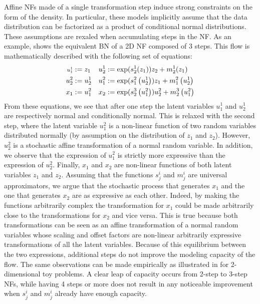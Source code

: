 Affine NFs made of a single transformation step induce strong constraints on the form of the density. In particular, these models implicitly assume that the data distribution can be factorized as a product of conditional normal distributions.
These assumptions are rexaled when accumulating steps in the NF.
As an example,  shows the equivalent BN of a 2D NF composed of 3 steps. This flow is mathematically described with the following set of equations:
\begin{align*}
\vspace{-5em}
\scriptstyle
    u_1^1 &:= z_1  & u_2^1 &:= \exp(s^1_2(z_1))z_2 + m_2^1(z_1) \\
    u_2^2 &:= u_2^1 & u_1^2 &:= \exp(s^2_1\left(u_2^1\right))z_1 + m^2_1\left(u_2^1\right)  \\%
    x_1 &:=  u_1^2 & %
    x_2 &:= \exp(s_2^3\left(u_1^2\right))u^2_2 + m^3_2\left( u_1^2 \right)
\end{align*}
From these equations, we see that after one step the latent variables $u^1_1$ and $u_2^1$ are respectively normal and conditionally normal.
This is relaxed with the second step, where the latent variable $u^2_1$ is a non-linear function of two random variables distributed normally (by assumption on the distribution of $z_1$ and $z_2$).
However, $u_2
^2$ is a stochastic affine transformation of a normal random variable.
In addition, we observe that the expression of $u^2_1$ is strictly more expressive than the expression of $u^2_2$.
Finally, $x_1$ and $x_2$ are non-linear functions of both latent variables $z_1$ and $z_2$.
Assuming that the functions $s^i_j$ and $m^i_j$ are universal approximators, we argue that the stochastic process that generates $x_1$ and the one that generates $x_2$ are as expressive as each other.
Indeed, by making the functions arbitrarily complex the transformation for $x_1$ could be made arbitrarily close to the transformations for $x_2$ and vice versa.
This is true because both transformations can be seen as an affine transformation of a normal random variables whose scaling and offset factors are non-linear arbitrarily expressive transformations of all the latent variables. Because of this equilibrium between the two expressions, additional steps do not improve the modeling capacity of the flow.
The same observations can be made empirically as illustrated in  for 2-dimensional toy problems. A clear leap of capacity occurs from 2-step to 3-step NFs, while having 4 steps or more does not result in any noticeable improvement when $s^i_j$ and $m^i_j$ already have enough capacity.

